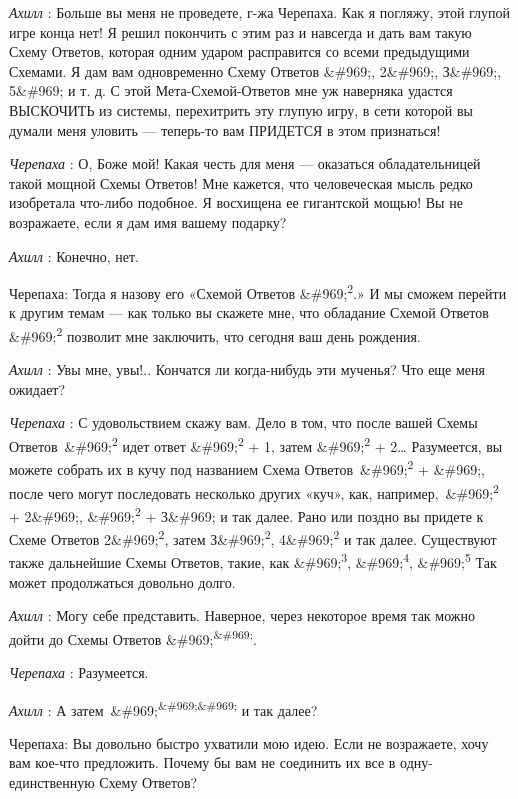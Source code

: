 \documentclass[../main.tex]{subfiles}
\begin{document}
\begin{dialogue}
\emph{Ахилл} : Больше вы меня не проведете, г-жа Черепаха. Как я погляжу, этой глупой игре конца нет! Я решил покончить с этим раз и навсегда и дать вам такую Схему Ответов, которая одним ударом расправится со всеми предыдущими Схемами. Я дам вам одновременно Схему Ответов \&\#969;, 2\&\#969;, З\&\#969;, 5\&\#969; и т. д. С этой Мета-Схемой-Ответов мне уж наверняка удастся ВЫСКОЧИТЬ из системы, перехитрить эту глупую игру, в сети которой вы думали меня уловить --- теперь-то вам ПРИДЕТСЯ в этом признаться!

\emph{Черепаха} : О, Боже мой! Какая честь для меня --- оказаться обладательницей такой мощной Схемы Ответов! Мне кажется, что человеческая мысль редко изобретала что-либо подобное. Я восхищена ее гигантской мощью! Вы не возражаете, если я дам имя вашему подарку?

\emph{Ахилл} : Конечно, нет.

Черепаха: Тогда я назову его «Схемой Ответов \&\#969;\textsuperscript{2}.» И мы сможем перейти к другим темам --- как только вы скажете мне, что обладание Схемой Ответов \&\#969;\textsuperscript{2} позволит мне заключить, что сегодня ваш день рождения.

\emph{Ахилл} : Увы мне, увы!.. Кончатся ли когда-нибудь эти мученья? Что еще меня ожидает?

\emph{Черепаха} : С удовольствием скажу вам. Дело в том, что после вашей Схемы Ответов~\&\#969;\textsuperscript{2} идет ответ \&\#969;\textsuperscript{2} + 1, затем \&\#969;\textsuperscript{2} + 2\ldots{} Разумеется, вы можете собрать их в кучу под названием Схема Ответов~\&\#969;\textsuperscript{2} + \&\#969;, после чего могут последовать несколько других «куч», как, например,~\&\#969;\textsuperscript{2} + 2\&\#969;, \&\#969;\textsuperscript{2} + З\&\#969; и так далее. Рано или поздно вы придете к Схеме Ответов 2\&\#969;\textsuperscript{2}, затем З\&\#969;\textsuperscript{2}, 4\&\#969;\textsuperscript{2} и так далее. Существуют также дальнейшие Схемы Ответов, такие, как \&\#969;\textsuperscript{3}, \&\#969;\textsuperscript{4}, \&\#969;\textsuperscript{5} Так может продолжаться довольно долго.

\emph{Ахилл} : Могу себе представить. Наверное, через некоторое время так можно дойти до Схемы Ответов \&\#969;\textsuperscript{\&\#969;}.

\emph{Черепаха} : Разумеется.

\emph{Ахилл} : А затем~\&\#969;\textsuperscript{\&\#969;\&\#969;} и так далее?

Черепаха: Вы довольно быстро ухватили мою идею. Если не возражаете, хочу вам кое-что предложить. Почему бы вам не соединить их все в одну-единственную Схему Ответов?


\end{dialogue}
\end{document}
